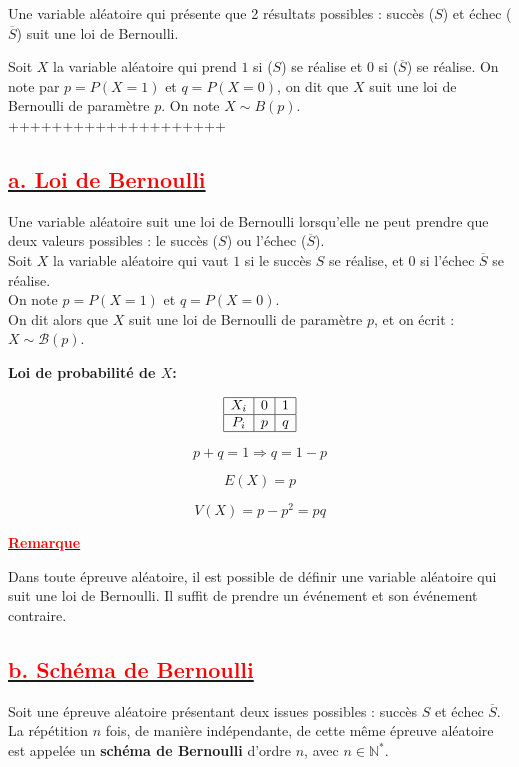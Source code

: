 \documentclass[12pt]{article}
\begin{document}
Une variable aléatoire qui présente que 2 résultats possibles : succès (\(S\)) et échec (\(\overline{S}\)) suit une loi de Bernoulli.
 
Soit \(X\) la variable aléatoire qui prend \(1\) si (\(S\)) se réalise et \(0\) si (\(\overline{S}\)) se réalise.
On note par \(p = P(X = 1)\) et \(q = P(X = 0)\), on dit que \(X\) suit une loi de Bernoulli de paramètre \(p\).
On note \(X \sim B(p)\).
++++++++++++++++++++
\subsection*{\underline{\textbf{\textcolor{red}{a. Loi de Bernoulli}}}}

Une variable aléatoire suit une loi de Bernoulli lorsqu'elle ne peut prendre que deux valeurs possibles : le succès (\(S\)) ou l’échec (\(\overline{S}\)). \\
Soit \(X\) la variable aléatoire qui vaut \(1\) si le succès \(S\) se réalise, et \(0\) si l’échec \(\overline{S}\) se réalise. \\
On note \(p = P(X = 1)\) et \(q = P(X = 0)\). \\
On dit alors que \(X\) suit une loi de Bernoulli de paramètre \(p\), et on écrit : \(X \sim \mathcal{B}(p)\).

\textbf{Loi de probabilité de \( X \):}

\[
\begin{array}{|c|c|c|}
\hline
X_i & 0 & 1 \\
\hline
P_i & p & q \\
\hline
\end{array}
\]

\[
p + q = 1 \Rightarrow q = 1 - p
\]

\[
E(X) = p
\]

\[
V(X) = p - p^2 = p q
\]

\underline{\textbf{\textcolor{red}{Remarque}}}

Dans toute épreuve aléatoire, il est possible de définir une variable aléatoire qui suit une loi de Bernoulli. Il suffit de prendre un événement et son événement contraire.

\subsection*{\underline{\textbf{\textcolor{red}{b. Schéma de Bernoulli}}}}

Soit une épreuve aléatoire présentant deux issues possibles : succès \( S \) et échec \( \overline{S} \).\\
La répétition \( n \) fois, de manière indépendante, de cette même épreuve aléatoire est appelée un \textbf{schéma de Bernoulli} d’ordre \( n \), avec \( n \in \mathbb{N}^* \).
\end{document}

